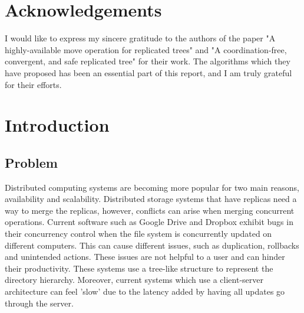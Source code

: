 \documentclass[12pt]{report}
\begin{document}
\chapter*{Acknowledgements}

I would like to express my sincere gratitude to the authors of the paper "A highly-available move operation for replicated
trees"\cite{9563274} and "A coordination-free, convergent, and safe replicated tree"\cite{https://doi.org/10.48550/arxiv.2103.04828} for their work. The algorithms which they have proposed has been an essential part of this report, and I am truly grateful for their efforts.



\newpage
\tableofcontents

\newpage

\setcounter{page}{1}

\chapter{Introduction}

\section{Problem}
Distributed computing systems are becoming more popular for two main reasons, availability and scalability. Distributed storage systems that have replicas need a way to merge the replicas, however, conflicts can arise when merging concurrent operations. Current software such as Google Drive and Dropbox exhibit bugs in their concurrency control when the file system is concurrently updated on different computers. This can cause different issues, such as duplication, rollbacks and unintended actions. These issues are not helpful to a user and can hinder their productivity. These systems use a tree-like structure to represent the directory hierarchy. Moreover, current systems which use a client-server architecture can feel 'slow' due to the latency added by having all updates go through the server.
\end{document}
